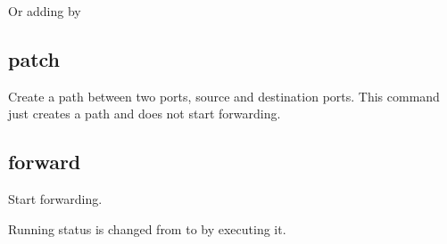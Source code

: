 \documentclass[a4paper,11pt,openany,oneside,english]{sphinxmanual}
\begin{document}
Or adding  by

\begin{sphinxVerbatim}[commandchars=\\\{\},formatcom=\footnotesize]
\end{sphinxVerbatim}


\subsection{patch}
\label{\detokenize{commands/primary:patch}}\label{\detokenize{commands/primary:commands-primary-patch}}
Create a path between two ports, source and destination ports.
This command just creates a path and does not start forwarding.

\begin{sphinxVerbatim}[commandchars=\\\{\},formatcom=\footnotesize]
\end{sphinxVerbatim}


\subsection{forward}
\label{\detokenize{commands/primary:forward}}\label{\detokenize{commands/primary:commands-primary-forward}}
Start forwarding.

\begin{sphinxVerbatim}[commandchars=\\\{\},formatcom=\footnotesize]
\end{sphinxVerbatim}

Running status is changed from  to  by
executing it.

\begin{sphinxVerbatim}[commandchars=\\\{\},formatcom=\footnotesize]
\end{sphinxVerbatim}
\end{document}
